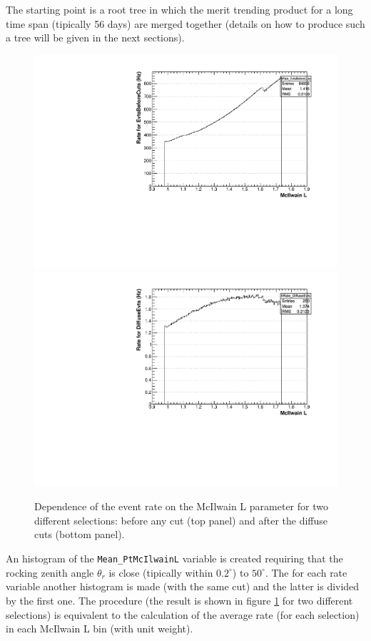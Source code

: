 \documentclass[a4paper,twocolumn]{article}
\begin{document}
The starting point is a root tree in which the merit trending product for a
long time span (tipically 56 days) are merged together (details on how to
produce such a tree will be given in the next sections).
\begin{figure}[htb!]
  \begin{center}
    \includegraphics[width=\linewidth]{figures/EvtsBeforeCuts_mcIlwainL}\\
    \includegraphics[width=\linewidth]{figures/DiffuseEvts_mcIlwainL}
    \caption{Dependence of the event rate on the McIlwain L parameter for
      two different selections: before any cut (top panel) and after the
      diffuse cuts (bottom panel).}
    \label{mcIlwainL}
  \end{center}
\end{figure}
An histogram of the \texttt{Mean\_PtMcIlwainL} variable
is created requiring that the rocking zenith angle $\theta_r$ is close
(tipically within $0.2^\circ$) to $50^\circ$. The for each rate variable 
another histogram is made (with the same cut) and the latter is divided by the
first one. The procedure (the result is shown in figure \ref{mcIlwainL} for
two different selections) is equivalent to the calculation of the average rate 
(for each selection) in each McIlwain L bin (with unit weight).
\end{document}
